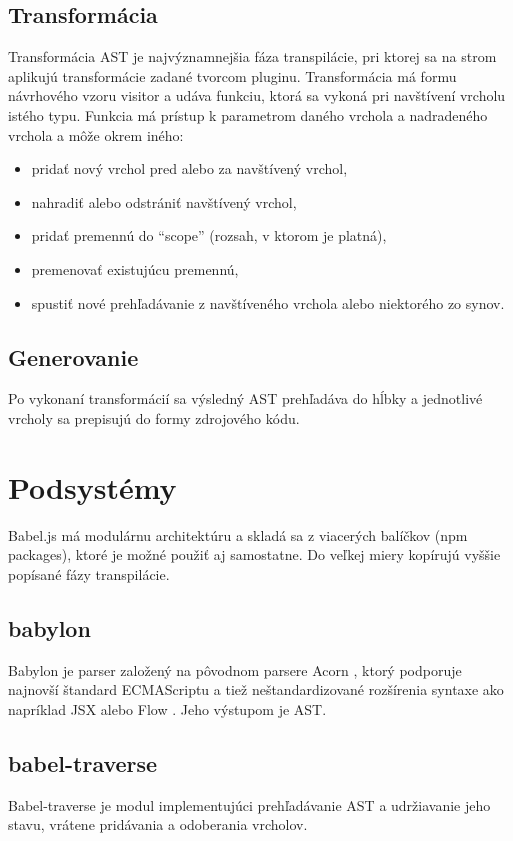 \subsection{Transformácia}
Transformácia AST je najvýznamnejšia fáza transpilácie, pri ktorej sa na strom aplikujú transformácie zadané tvorcom pluginu. Transformácia má formu návrhového vzoru visitor a udáva funkciu, ktorá sa vykoná pri navštívení vrcholu istého typu. Funkcia má prístup k parametrom daného vrchola a nadradeného vrchola a môže okrem iného:
\begin{itemize}
\item pridať nový vrchol pred alebo za navštívený vrchol,
\item nahradiť alebo odstrániť navštívený vrchol,
\item pridať premennú do ``scope'' (rozsah, v ktorom je platná),
\item premenovať existujúcu premennú,
\item spustiť nové prehľadávanie z navštíveného vrchola alebo niektorého zo synov.
\end{itemize}

\subsection{Generovanie}
Po vykonaní transformácií sa výsledný AST prehľadáva do hĺbky a jednotlivé vrcholy sa prepisujú do formy zdrojového kódu.

\section{Podsystémy}
Babel.js má modulárnu architektúru a skladá sa z viacerých balíčkov (npm packages), ktoré je možné použiť aj samostatne. Do veľkej miery kopírujú vyššie popísané fázy transpilácie.

\subsection{babylon}
Babylon je parser založený na pôvodnom parsere Acorn \cite{Acorn}, ktorý podporuje najnovší štandard ECMAScriptu a tiež neštandardizované rozšírenia syntaxe ako napríklad JSX \cite{JSX} alebo Flow \cite{Flow}. Jeho výstupom je AST.

\subsection{babel-traverse}
Babel-traverse je modul implementujúci prehľadávanie AST a udržiavanie jeho stavu, vrátene pridávania a odoberania vrcholov.

